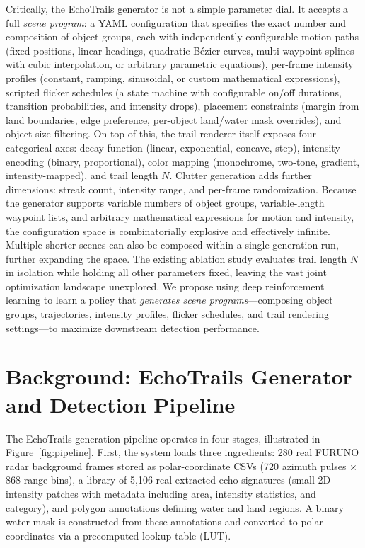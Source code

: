 \documentclass[12pt]{article}
\begin{document}
Critically, the EchoTrails generator is not a simple parameter dial. It accepts a full \textit{scene program}: a YAML configuration that specifies the exact number and composition of object groups, each with independently configurable motion paths (fixed positions, linear headings, quadratic B\'{e}zier curves, multi-waypoint splines with cubic interpolation, or arbitrary parametric equations), per-frame intensity profiles (constant, ramping, sinusoidal, or custom mathematical expressions), scripted flicker schedules (a state machine with configurable on/off durations, transition probabilities, and intensity drops), placement constraints (margin from land boundaries, edge preference, per-object land/water mask overrides), and object size filtering. On top of this, the trail renderer itself exposes four categorical axes: decay function (linear, exponential, concave, step), intensity encoding (binary, proportional), color mapping (monochrome, two-tone, gradient, intensity-mapped), and trail length $N$. Clutter generation adds further dimensions: streak count, intensity range, and per-frame randomization. Because the generator supports variable numbers of object groups, variable-length waypoint lists, and arbitrary mathematical expressions for motion and intensity, the configuration space is combinatorially explosive and effectively infinite. Multiple shorter scenes can also be composed within a single generation run, further expanding the space. The existing ablation study evaluates trail length $N$ in isolation while holding all other parameters fixed, leaving the vast joint optimization landscape unexplored. We propose using deep reinforcement learning to learn a policy that \textit{generates scene programs}---composing object groups, trajectories, intensity profiles, flicker schedules, and trail rendering settings---to maximize downstream detection performance.

\section{Background: EchoTrails Generator and Detection Pipeline}

The EchoTrails generation pipeline operates in four stages, illustrated in Figure~\ref{fig:pipeline}. First, the system loads three ingredients: 280 real FURUNO radar background frames stored as polar-coordinate CSVs (720 azimuth pulses $\times$ 868 range bins), a library of 5,106 real extracted echo signatures (small 2D intensity patches with metadata including area, intensity statistics, and category), and polygon annotations defining water and land regions. A binary water mask is constructed from these annotations and converted to polar coordinates via a precomputed lookup table (LUT).
\end{document}

